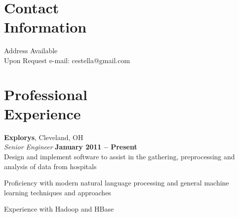 \documentclass[margin,line,12pt]{resume}
\begin{document}
\begin{resume}
    \thispagestyle{empty}
    \section{\mysidestyle Contact\\Information}

    Address Available             \vspace{0mm}\\\vspace{0mm}%
    Upon Request                  \hfill e-mail: cestella@gmail.com       \vspace{0mm}\\\vspace{-4.5mm}%

    \section{\mysidestyle Professional\\Experience}

    \textbf{Explorys}, Cleveland, OH \vspace{2mm}\\\vspace{1mm}%
    \textsl{Senior Engineer} \hfill \textbf{January 2011 -- Present}\\
    Design and implement software to assist in the gathering, preprocessing
    and analysis of data from hospitals
    \begin{list2}
    \item Proficiency with modern natural language processing and general machine learning techniques and approaches
    \item Experience with Hadoop and HBase
    \end{list2}


\end{resume}
\end{document}
